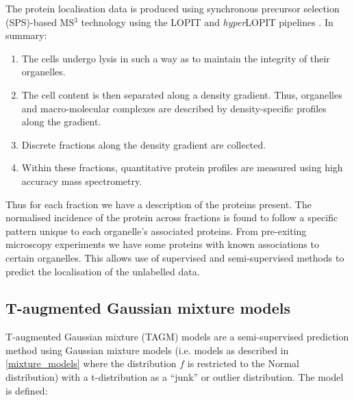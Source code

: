 \documentclass[11pt]{article} %
\begin{document}
The protein localisation data is produced using synchronous precursor selection (SPS)-based MS$^3$ technology using the LOPIT and \emph{hyper}LOPIT pipelines \cite{GeladakiLOPITDCsimplerapproach2018}\cite{DunkleyLocalizationOrganelleProteins2004}. In summary:
\begin{enumerate}
 \item The cells undergo lysis in such a way as to maintain the integrity of their organelles.
 \item The cell content is then separated along a density gradient. Thus, organelles and macro-molecular complexes are described by density-specific profiles along the gradient.
 \item Discrete fractions along the density gradient are collected.
 \item Within these fractions, quantitative protein profiles are measured using high accuracy mass spectrometry.
\end{enumerate}
Thus for each fraction we have a description of the proteins present. The normalised incidence of the protein across fractions is found to follow a specific pattern unique to each organelle's associated proteins. From pre-exiting microscopy experiments we have some proteins with known associations to certain organelles. This allows use of supervised and semi-supervised methods to predict the localisation of the unlabelled data.

\subsection{T-augmented Gaussian mixture models}
T-augmented Gaussian mixture (TAGM) models are a semi-supervised prediction method using Gaussian mixture models (i.e. models as described in \ref{mixture_models} where the distribution $f$ is restricted to the Normal distribution) with a t-distribution as a ``junk'' or outlier distribution. The model is defined:
\end{document}
